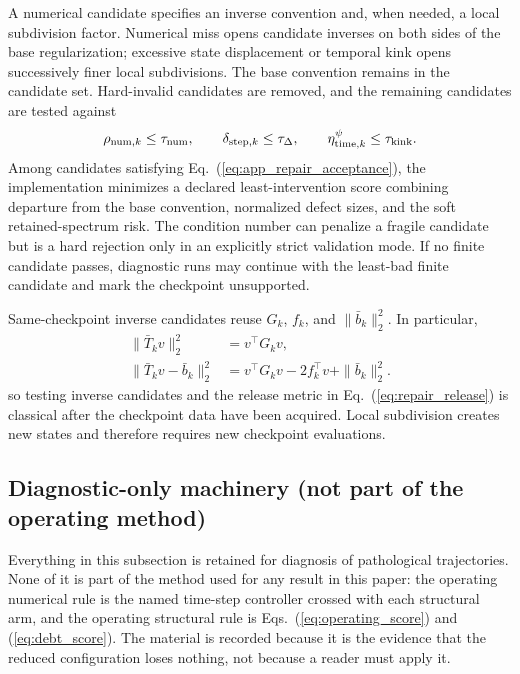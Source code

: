 \documentclass[
  reprint,
  amsmath,
  amssymb,
  aps,
  pra,
  nofootinbib,
  superscriptaddress,
  floatfix
]{revtex4-2}
\begin{document}
A numerical candidate specifies an inverse convention and, when needed, a local subdivision factor.  Numerical miss opens candidate inverses on both sides of the base regularization; excessive state displacement or temporal kink opens successively finer local subdivisions.  The base convention remains in the candidate set.  Hard-invalid candidates are removed, and the remaining candidates are tested against
\begin{equation}
\rho_{{\rm num},k}\le\tau_{\rm num},
\qquad
\delta_{{\rm step},k}\le\tau_\Delta,
\qquad
\eta_{{\rm time},k}^{\psi}\le\tau_{\rm kink}.
\label{eq:app_repair_acceptance}
\end{equation}
Among candidates satisfying Eq.~(\ref{eq:app_repair_acceptance}), the implementation minimizes a declared least-intervention score combining departure from the base convention, normalized defect sizes, and the soft retained-spectrum risk.  The condition number can penalize a fragile candidate but is a hard rejection only in an explicitly strict validation mode.  If no finite candidate passes, diagnostic runs may continue with the least-bad finite candidate and mark the checkpoint unsupported.

Same-checkpoint inverse candidates reuse \(G_k\), \(f_k\), and \(\|\bar b_k\|_2^2\).  In particular,
\begin{equation}
\begin{aligned}
\|\bar T_kv\|_2^2
&=v^\top G_kv,\\
\|\bar T_kv-\bar b_k\|_2^2
&=v^\top G_kv-2f_k^\top v+\|\bar b_k\|_2^2.
\end{aligned}
\label{eq:app_classical_quadratic_forms}
\end{equation}
so testing inverse candidates and the release metric in Eq.~(\ref{eq:repair_release}) is classical after the checkpoint data have been acquired.  Local subdivision creates new states and therefore requires new checkpoint evaluations.

\subsection{Diagnostic-only machinery (not part of the operating method)}
\label{app:diagnostic_only}

Everything in this subsection is retained for diagnosis of pathological
trajectories.  None of it is part of the method used for any result in this
paper: the operating numerical rule is the named time-step controller crossed
with each structural arm, and the operating structural rule is
Eqs.~(\ref{eq:operating_score}) and (\ref{eq:debt_score}).  The material
is recorded because it is the evidence that the reduced configuration loses
nothing, not because a reader must apply it.
\end{document}
